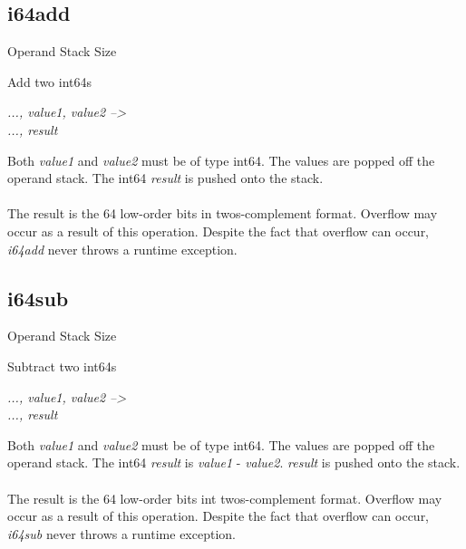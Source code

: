 \documentclass[12pt]{article}
\begin{document}
		\subsection*{i64add}
			
			\begin{labeling}{Operand Stack Size}
				\item [\textbf{Operation}] Add two int64s
				\item [\textbf{Format}] 
				\item [\textbf{Operand Stack}] \textit{..., value1, value2 --\textgreater } \\
										\textit{..., result}
				\item [\textbf{Description}] Both \textit{value1} and \textit{value2} must be of type int64. The values are popped off the operand stack. The int64 \textit{result} is pushed onto the stack. \\ \\
				The result is the 64 low-order bits in twos-complement format. 
				Overflow may occur as a result of this operation. Despite the fact that overflow can occur, \textit{i64add} never throws a runtime exception. 							\end{labeling}
			
		\newpage
		
		\subsection*{i64sub}
			\begin{labeling}{Operand Stack Size}
				\item [\textbf{Operation}] Subtract two int64s
				\item [\textbf{Format}] 
				\item [\textbf{Operand Stack}] \textit{..., value1, value2 --\textgreater } \\
										\textit{..., result}
				\item [\textbf{Description}] Both \textit{value1} and \textit{value2} must be of type int64. The values are popped off the operand stack. The int64 \textit{result} is \textit{value1} - \textit{value2}. \textit{result} is pushed onto the stack. \\ \\
				The result is the 64 low-order bits int twos-complement format. 
				Overflow may occur as a result of this operation. Despite the fact that overflow can occur, \textit{i64sub} never throws a runtime exception. 			\end{labeling}		
			
\end{document}
